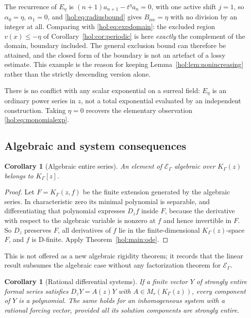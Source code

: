 \documentclass[11pt]{article}
\numberwithin{equation}{section}
\newtheorem{corollary}[theorem]{Corollary}
\theoremstyle{definition}
\theoremstyle{remark}
\newcommand{\K}{K_\Gamma}
\newcommand{\E}{\mathcal E_\Gamma}
\begin{document}
The recurrence of $E_\eta$ is $(n+1)a_{n+1}-t^\eta a_n=0$, with one active
shift $j=1$, so $\alpha_0=\eta$, $\alpha_1=0$, and
\eqref{hol:eq:radiusbound} gives $B_{\mathrm{rec}}=\eta$ with no division by
an integer at all. Comparing with \eqref{hol:eq:expdomain}: the excluded
region $v(x)\le-\eta$ of Corollary~\ref{hol:cor:periodic} is here
\emph{exactly} the complement of the domain, boundary included. The general
exclusion bound can therefore be attained, and the closed form of the boundary
is not an artefact of a lossy estimate. This example is the reason for keeping
Lemma~\ref{hol:lem:nonincreasing} rather than the strictly descending version
alone.

There is no conflict with any scalar exponential on a surreal field: $E_\eta$
is an ordinary power series in $z$, not a total exponential evaluated by an
independent construction. Taking $\eta=0$ recovers the elementary observation
\eqref{hol:eq:monomialexp}.

\subsection{Algebraic and system consequences}

\begin{corollary}[Algebraic entire series]\label{hol:cor:algebraic}
An element of $\E$ algebraic over $\K(z)$ belongs to $\K[z]$.
\end{corollary}

\begin{proof}
Let $F=\K(z,f)$ be the finite extension generated by the algebraic series. In
characteristic zero its minimal polynomial is separable, and differentiating
that polynomial expresses $D_zf$ inside $F$, because the derivative with
respect to the algebraic variable is nonzero at $f$ and hence invertible in
$F$. So $D_z$ preserves $F$, all derivatives of $f$ lie in the
finite-dimensional $\K(z)$-space $F$, and $f$ is D-finite. Apply
Theorem~\ref{hol:main:ode}.
\end{proof}

This is not offered as a new algebraic rigidity theorem; it records that the
linear result subsumes the algebraic case without any factorization theorem
for $\E$.

\begin{corollary}[Rational differential systems]\label{hol:cor:systems}
If a finite vector $Y$ of strongly entire formal series satisfies
$D_zY=A(z)Y$ with $A\in M_r(\K(z))$, every component of $Y$ is a polynomial.
The same holds for an inhomogeneous system with a rational forcing vector,
provided all its solution components are strongly entire.
\end{corollary}
\end{document}
